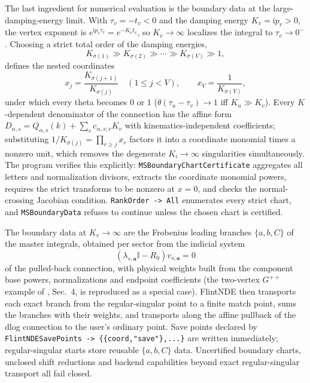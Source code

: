 \documentclass[11pt,a4paper]{article}
\newcommand{\ii}{\mathrm i}
\newcommand{\Id}{\mathbb I}
\begin{document}
The last ingredient for numerical evaluation is the boundary data at the large-damping-energy
limit. With $\tau_v=-t_v<0$ and the damping energy $K_v=\ii p_v>0$, the vertex exponent is
$e^{\ii p_v\tau_v}=e^{-K_vt_v}$, so $K_v\to\infty$ localizes the integral to $\tau_v\to0^-$.
Choosing a strict total order of the damping energies,
\begin{equation}
  K_{\sigma(1)}\gg K_{\sigma(2)}\gg\cdots\gg K_{\sigma(V)}\gg1,
\end{equation}
defines the nested coordinates
\begin{equation}
  x_j=\frac{K_{\sigma(j+1)}}{K_{\sigma(j)}}\quad(1\leq j<V),
  \qquad
  x_V=\frac1{K_{\sigma(V)}},
\end{equation}
under which every theta becomes $0$ or $1$ ($\theta(\tau_u-\tau_v)\to1$ iff $K_u\gg K_v$). Every
$K$-dependent denominator of the connection has the affine form
$D_{\alpha,s}=Q_{\alpha,s}(k)+\sum_v c_{\alpha,s;v}K_v$ with kinematics-independent coefficients;
substituting $1/K_{\sigma(j)}=\prod_{r\ge j}x_r$ factors it into a coordinate monomial times a
nonzero unit, which removes the degenerate $K_i\to\infty$ singularities simultaneously. The program
verifies this explicitly: \texttt{MSBoundaryChartCertificate} aggregates all letters and
normalization divisors, extracts the coordinate monomial powers, requires the strict transforms to
be nonzero at $x=0$, and checks the normal-crossing Jacobian condition.
\texttt{RankOrder -> All} enumerates every strict chart, and \texttt{MSBoundaryData} refuses to
continue unless the chosen chart is certified.

The boundary data at $K_v\to\infty$ are the Frobenius leading branches $\{a,b,C\}$ of the master
integrals, obtained per sector from the indicial system
\begin{equation}
  (\lambda_{s,\bm a}\Id-R_0)v_{s,\bm a}=0
\end{equation}
of the pulled-back connection, with physical weights built from the component base powers,
normalizations and endpoint coefficients (the two-vertex $G^{++}$ example of
\citet{Chen:2024jms}, Sec.~4, is reproduced as a special case). FlintNDE then transports each exact
branch from the regular-singular point to a finite match point, sums the branches with their
weights, and transports along the affine pullback of the dlog connection to the user's ordinary
point. Save points declared by \texttt{FlintNDESavePoints -> \{\{coord,"save"\},...\}} are written
immediately; regular-singular starts store reusable $\{a,b,C\}$ data. Uncertified boundary charts,
unclosed shift reductions and backend capabilities beyond exact regular-singular transport all
fail closed.
\end{document}

